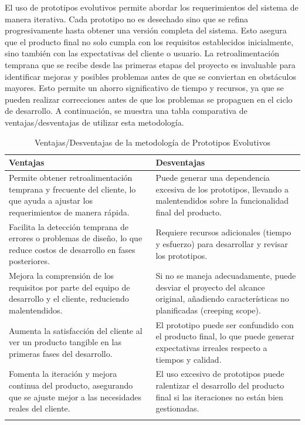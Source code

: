 El uso de prototipos evolutivos permite abordar los requerimientos del sistema de manera iterativa. Cada prototipo no es desechado sino que se refina progresivamente hasta obtener una versión completa del sistema. Esto asegura que el producto final no solo cumpla con los requisitos establecidos inicialmente, sino también con las expectativas del cliente o usuario. \newline \newline
La retroalimentación temprana que se recibe desde las primeras etapas del proyecto es invaluable para identificar mejoras y posibles problemas antes de que se conviertan en obstáculos mayores. Esto permite un ahorro significativo de tiempo y recursos, ya que se pueden realizar correcciones antes de que los problemas se propaguen en el ciclo de desarrollo. \newline \newline
A continuación, se muestra una tabla comparativa de ventajas/desventajas de utilizar esta metodología.
\begin{longtable}{|m{6.5cm}|m{6.5cm}|}
	\hline
	\rowcolor{black!75} \color{white}\textbf{Ventajas} & \color{white}\textbf{Desventajas} \\
	\hline
	Permite obtener retroalimentación temprana y frecuente del cliente, lo que ayuda a ajustar los requerimientos de manera rápida. &
	Puede generar una dependencia excesiva de los prototipos, llevando a malentendidos sobre la funcionalidad final del producto. \\
	\hline
	Facilita la detección temprana de errores o problemas de diseño, lo que reduce costos de desarrollo en fases posteriores. &
	Requiere recursos adicionales (tiempo y esfuerzo) para desarrollar y revisar los prototipos. \\
	\hline
	Mejora la comprensión de los requisitos por parte del equipo de desarrollo y el cliente, reduciendo malentendidos. &
	Si no se maneja adecuadamente, puede desviar el proyecto del alcance original, añadiendo características no planificadas (creeping scope). \\
	\hline
	Aumenta la satisfacción del cliente al ver un producto tangible en las primeras fases del desarrollo. &
	El prototipo puede ser confundido con el producto final, lo que puede generar expectativas irreales respecto a tiempos y calidad. \\
	\hline
	Fomenta la iteración y mejora continua del producto, asegurando que se ajuste mejor a las necesidades reales del cliente. &
	El uso excesivo de prototipos puede ralentizar el desarrollo del producto final si las iteraciones no están bien gestionadas. \\
	
	\hline
	\rowcolor{white} \caption{Ventajas/Desventajas de la metodología de Prototipos Evolutivos} \label{tabla:Ventajas-Desventajas-Prototipos} \\
\end{longtable}

